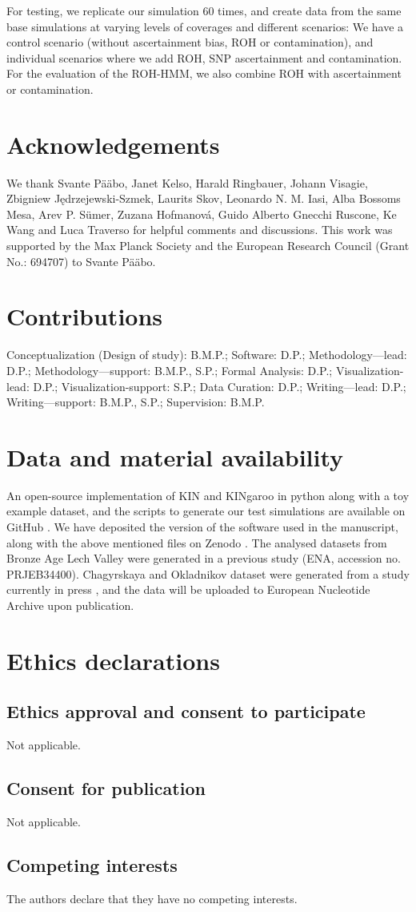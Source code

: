 \documentclass[12pt, letterpaper]{article}
\begin{document}
For testing, we replicate our simulation 60 times, and create data from the same base simulations at varying levels of coverages and different scenarios: We have a control scenario (without ascertainment bias, ROH or contamination), and individual scenarios where we add ROH, SNP ascertainment and contamination. For the evaluation of the ROH-HMM, we also combine ROH with ascertainment or contamination.


\section{Acknowledgements}
We thank Svante Pääbo, Janet Kelso, Harald Ringbauer, Johann Visagie, Zbigniew Jędrzejewski-Szmek, Laurits Skov, Leonardo N. M. Iasi, Alba Bossoms Mesa, Arev P. Sümer, Zuzana Hofmanová, Guido Alberto Gnecchi Ruscone, Ke Wang and Luca Traverso for helpful comments and discussions. This work was supported by the Max Planck Society and the European Research Council (Grant No.: 694707) to Svante Pääbo.

\section{Contributions}
Conceptualization (Design of study): B.M.P.; Software: D.P.; Methodology—lead: D.P.; Methodology—support: B.M.P., S.P.; Formal Analysis: D.P.; Visualization-lead: D.P.; Visualization-support: S.P.; Data Curation: D.P.; Writing—lead: D.P.; Writing—support: B.M.P., S.P.; Supervision: B.M.P.

\section{Data and material availability}
An open-source implementation of KIN and KINgaroo in python along with a toy example dataset, and the scripts to generate our test simulations are available on GitHub \cite{divyaratan_popli_httpsgithubcomdivyaratanpoplikinship_inferencereleasestagv312_2022}. We have deposited the version of the software used in the manuscript, along with the above mentioned files on Zenodo \cite{divyaratan_popli_httpsdoiorg105281zenodo6561015_nodate}. The analysed datasets from Bronze Age Lech Valley were generated in a previous study (ENA, accession no. PRJEB34400). Chagyrskaya and Okladnikov dataset were generated from a study currently in press \cite{laurits_skov_genetic_nodate}, and the data will be uploaded to European Nucleotide Archive upon publication. 

\section{Ethics declarations}
\subsection{Ethics approval and consent to participate}
Not applicable.

\subsection{Consent for publication}
Not applicable.

\subsection{Competing interests}
The authors declare that they have no competing interests.




\end{document}
